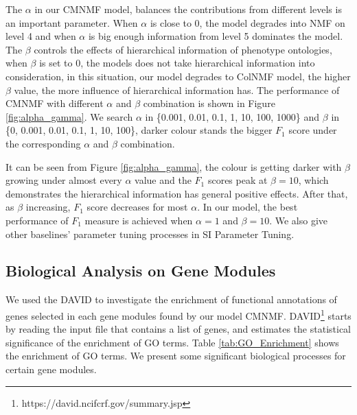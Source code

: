 \documentclass{bmcart}
\begin{document}
The $\alpha$ in our CMNMF model, balances the contributions from different levels is an important parameter. When $\alpha$ is close to 0, the model degrades into NMF on level 4 and when $\alpha$ is big enough information from level 5 dominates the model. The $\beta$ controls the effects of hierarchical information of phenotype ontologies, when $\beta$ is set to 0, the models does not take hierarchical information into consideration, in this situation, our model degrades to ColNMF model, the higher $\beta$ value, the more influence of hierarchical information has.
 The performance of CMNMF with different $\alpha$ and $\beta$ combination is shown in Figure \ref{fig:alpha_gamma}. We search $\alpha$ in \{0.001, 0.01, 0.1, 1, 10, 100, 1000\} and $\beta$ in \{0, 0.001, 0.01, 0.1, 1, 10, 100\}, darker colour stands the bigger $F_1$ score under the corresponding $\alpha$ and $\beta$ combination.

It can be seen from Figure \ref{fig:alpha_gamma}, the colour is getting darker with $\beta$ growing under almost every $\alpha$ value and the $F_1$ scores peak at $\beta=10$, which demonstrates the hierarchical information has general positive effects. After that, as $\beta$ increasing, $F_1$ score decreases for most $\alpha$. In our model, the best performance of $F_1$ measure is achieved when $\alpha=1$ and $\beta = 10$. We also give other baselines' parameter tuning processes in {\color{red} SI Parameter Tuning}.

\subsection*{\textbf{Biological Analysis on Gene Modules}}%

We used the DAVID \cite{Dennis2003} to investigate the enrichment of functional annotations of genes selected in each gene modules found by our model CMNMF. DAVID\footnote{https://david.ncifcrf.gov/summary.jsp} starts by reading the input file that contains a list of genes, and estimates the statistical significance of the enrichment of GO terms.
Table \ref{tab:GO_Enrichment} shows the enrichment of GO terms. We present some significant biological processes for certain  gene modules.
\end{document}
